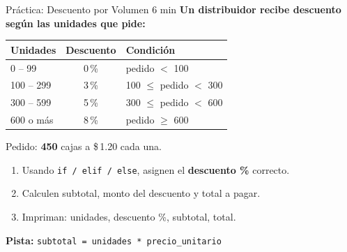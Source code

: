 \documentclass[aspectratio=169, 11pt]{beamer}
\begin{document}
\begin{frame}[fragile,shrink=30]{Práctica: Descuento por Volumen \hfill {\normalsize\color{arcaRed}\faClock\hspace{4pt}6 min}}
  \vspace{-6pt}
  {\small\color{arcaDark}\bfseries
    Un distribuidor recibe descuento según las unidades que pide:}

  \vspace{6pt}
  \begin{center}
  {\footnotesize
  \renewcommand{\arraystretch}{1.2}
  \begin{tabular}{l c l}
    \toprule
    {\bfseries\color{arcaDark} Unidades}
    & {\bfseries\color{arcaDark} Descuento}
    & {\bfseries\color{arcaDark} Condición} \\
    \midrule
    0 -- 99   & 0\,\%  & pedido $<$ 100 \\
    100 -- 299 & 3\,\%  & 100 $\leq$ pedido $<$ 300 \\
    300 -- 599 & 5\,\%  & 300 $\leq$ pedido $<$ 600 \\
    600 o más  & 8\,\%  & pedido $\geq$ 600 \\
    \bottomrule
  \end{tabular}
  }
  \end{center}

  \vspace{4pt}
  {\footnotesize\color{textMuted}
    Pedido: \textbf{450} cajas a \$\,1.20 cada una.}

  \vspace{2pt}
  {\footnotesize
  \begin{enumerate}\setlength{\itemsep}{2pt}
    \item[{\color{arcaRed}\bfseries 1.}]
      Usando \texttt{if / elif / else}, asignen el \textbf{descuento \%} correcto.
    \item[{\color{arcaRed}\bfseries 2.}]
      Calculen subtotal, monto del descuento y total a pagar.
    \item[{\color{arcaRed}\bfseries 3.}]
      Impriman: unidades, descuento \%, subtotal, total.
  \end{enumerate}
  }

  \vspace{3pt}
  {\scriptsize\color{textMuted}
    \faLightbulb[regular]\hspace{4pt}\textbf{Pista:}
    \texttt{subtotal = unidades * precio\_unitario}}
\end{frame}
\end{document}
